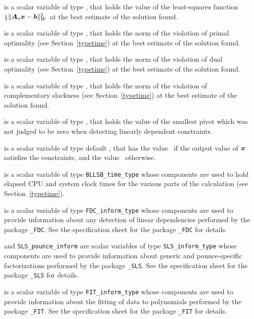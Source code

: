 \documentclass{galahad}
\newcommand{\packagename}{BLLSB}
\begin{document}
\begin{description}
 is a scalar variable of type \realdp, that holds the value of 
the least-squares function ${\scriptstyle \frac{1}{2}} \| {\bm{A}}_o {\bm{x}} - {\bm{b}}\|_W^2$ 
at the best estimate of the solution found.

 is a scalar variable of type \realdp,
that holds the norm of the violation of primal optimality
(see Section~\ref{typetime}) at the best estimate of the solution found.

 is a scalar variable of type \realdp,
that holds the norm of the violation of dual optimality
(see Section~\ref{typetime}) at the best estimate of the solution found.

is a scalar variable of type \realdp,
that holds the norm of the violation of complementary slackness
(see Section~\ref{typetime}) at the best estimate of the solution found.

is a scalar variable of type \realdp,
that holds the value of the smallest pivot which was not judged to be 
zero when detecting linearly dependent constraints.

 is a scalar variable of type default \logical, that has the
value \true\ if the output value of ${\bm{x}}$ satisfies the constraints,
and the value \false\ otherwise.

 is a scalar variable of type {\tt \packagename\_time\_type}
whose components are used to hold elapsed CPU and system clock times for the
various parts of the calculation (see Section~\ref{typetime}).

 is a scalar variable of type
{\tt FDC\_inform\_type}
whose components are used to provide information about
any detection of linear dependencies
performed by the package
{\tt \libraryname\_FDC}.
See the specification sheet for the package
{\tt \libraryname\_FDC} for details.

 and {\tt SLS\_pounce\_inform}
are scalar variables of type {\tt SLS\_inform\_type}
whose components are used to provide information about
generic and pounce-specific factorizations performed by the package
{\tt \libraryname\_SLS}.
See the specification sheet for the package
{\tt \libraryname\_SLS} for details.

 is a scalar variable of type
{\tt FIT\_inform\_type}
whose components are used to provide information about the fitting
of data to polynomials performed by the package
{\tt \libraryname\_FIT}.
See the specification sheet for the package
{\tt \libraryname\_FIT} for details.


\end{description}
\end{document}
